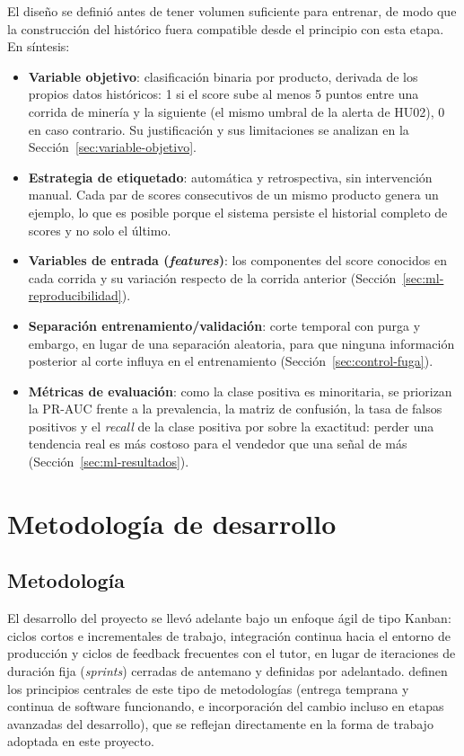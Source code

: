 El diseño se definió antes de tener volumen suficiente para entrenar, de modo que la construcción del histórico fuera compatible desde el principio con esta etapa. En síntesis:

\begin{itemize}
	\item \textbf{Variable objetivo}: clasificación binaria por producto, derivada de los propios datos históricos: 1 si el score sube al menos 5 puntos entre una corrida de minería y la siguiente (el mismo umbral de la alerta de HU02), 0 en caso contrario. Su justificación y sus limitaciones se analizan en la Sección~\ref{sec:variable-objetivo}.
	\item \textbf{Estrategia de etiquetado}: automática y retrospectiva, sin intervención manual. Cada par de scores consecutivos de un mismo producto genera un ejemplo, lo que es posible porque el sistema persiste el historial completo de scores y no solo el último.
	\item \textbf{Variables de entrada (\emph{features})}: los componentes del score conocidos en cada corrida y su variación respecto de la corrida anterior (Sección~\ref{sec:ml-reproducibilidad}).
	\item \textbf{Separación entrenamiento/validación}: corte temporal con purga y embargo, en lugar de una separación aleatoria, para que ninguna información posterior al corte influya en el entrenamiento (Sección~\ref{sec:control-fuga}).
	\item \textbf{Métricas de evaluación}: como la clase positiva es minoritaria, se priorizan la PR-AUC frente a la prevalencia, la matriz de confusión, la tasa de falsos positivos y el \emph{recall} de la clase positiva por sobre la exactitud: perder una tendencia real es más costoso para el vendedor que una señal de más (Sección~\ref{sec:ml-resultados}).
\end{itemize}

\section{Metodología de desarrollo}\label{sec:metodologia}

\subsection{Metodología}

El desarrollo del proyecto se llevó adelante bajo un enfoque ágil de tipo Kanban: ciclos cortos e incrementales de trabajo, integración continua hacia el entorno de producción y ciclos de feedback frecuentes con el tutor, en lugar de iteraciones de duración fija (\emph{sprints}) cerradas de antemano y definidas por adelantado. \textcite{BeckEtAl2001} definen los principios centrales de este tipo de metodologías (entrega temprana y continua de software funcionando, e incorporación del cambio incluso en etapas avanzadas del desarrollo), que se reflejan directamente en la forma de trabajo adoptada en este proyecto.

